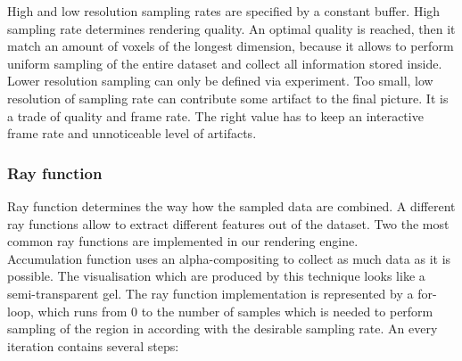 \documentclass[twoside, english, 11pt]{report}
\begin{document}
High and low resolution sampling rates are specified by a constant buffer. High sampling rate determines rendering quality. An optimal quality is reached, then it match an amount of voxels of the longest dimension, because it allows to perform uniform sampling of the entire dataset and collect all information stored inside. Lower resolution sampling can only be defined via experiment. Too small, low resolution of sampling rate can contribute some artifact to the final picture. It is a trade of quality and frame rate. The right value has to keep an interactive frame rate and unnoticeable level of artifacts.


\subsubsection{Ray function}
Ray function determines the way how the sampled data are combined. A different ray functions allow to extract different features out of the dataset. Two the most common ray functions are implemented in our rendering engine.\\

Accumulation function uses an alpha-compositing to collect as much data as it is possible. The visualisation which are produced by this technique looks like a semi-transparent gel. The ray function implementation is represented by a for-loop, which runs from 0 to the number of samples which is needed to perform sampling of the region in according with the desirable sampling rate. An every iteration contains several steps:
\end{document}
